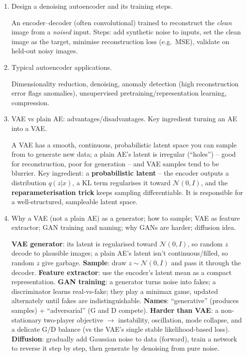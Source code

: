 \documentclass[10pt,a4paper]{article}
\newcommand{\q}[1]{\item #1}
\begin{document}
\begin{enumerate}[leftmargin=*,label=\textbf{Q\arabic*.}]

\q Design a denoising autoencoder and its training steps.
\begin{answerbox}
An encoder--decoder (often convolutional) trained to reconstruct the \emph{clean} image from a \emph{noised} input. Steps: add synthetic noise to inputs, set the clean image as the target, minimise reconstruction loss (e.g.\ MSE), validate on held-out noisy images.
\end{answerbox}

\q Typical autoencoder applications.
\begin{answerbox}
Dimensionality reduction, denoising, anomaly detection (high reconstruction error flags anomalies), unsupervised pretraining/representation learning, compression.
\end{answerbox}

\q VAE vs plain AE: advantages/disadvantages. Key ingredient turning an AE into a VAE.
\begin{answerbox}
A VAE has a smooth, continuous, probabilistic latent space you can sample from to generate new data; a plain AE's latent is irregular (``holes'') -- good for reconstruction, poor for generation -- and VAE samples tend to be blurrier. Key ingredient: a \textbf{probabilistic latent} -- the encoder outputs a distribution $q(z|x)$, a KL term regularises it toward $\mathcal{N}(0,I)$, and the \textbf{reparameterisation trick} keeps sampling differentiable. It is responsible for a well-structured, sampleable latent space.
\end{answerbox}

\q Why a VAE (not a plain AE) as a generator; how to sample; VAE as feature extractor; GAN training and naming; why GANs are harder; diffusion idea.
\begin{answerbox}
\textbf{VAE generator}: its latent is regularised toward $\mathcal{N}(0,I)$, so random $z$ decode to plausible images; a plain AE's latent isn't continuous/filled, so random $z$ give garbage. \textbf{Sample}: draw $z\sim\mathcal{N}(0,I)$ and pass it through the decoder. \textbf{Feature extractor}: use the encoder's latent mean as a compact representation. \textbf{GAN training}: a generator turns noise into fakes; a discriminator learns real-vs-fake; they play a minimax game, updated alternately until fakes are indistinguishable. \textbf{Names}: ``generative'' (produces samples) + ``adversarial'' (G and D compete). \textbf{Harder than VAE}: a non-stationary two-player objective $\to$ instability, oscillation, mode collapse, and a delicate G/D balance (vs the VAE's single stable likelihood-based loss). \textbf{Diffusion}: gradually add Gaussian noise to data (forward), train a network to reverse it step by step, then generate by denoising from pure noise.
\end{answerbox}


\end{enumerate}
\end{document}
